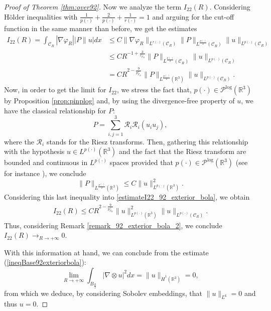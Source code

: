 \documentclass[a4paper,12pt]{amsart}
\theoremstyle{definition}
\theoremstyle{plain}
\def\R{\mathbb{R}}
\renewcommand{\phi}{\varphi}
\let\phi\varphi
\def\R{\mathbb R}
\def\vu{ u }
\def\vn{ \nabla }
\def\mPl{\mathcal{P}^{\text{log}}}
\begin{document}
\begin{proof}[Proof of Theorem \ref{thm:over92}]
Now we analyze the term $I_{22}(R)$. Considering H\"older inequalities with $\frac{1}{p(\cdot)}+\frac{2}{p(\cdot)}+\frac{1}{r(\cdot)}=1$ and arguing for the cut-off function in the same manner than before, we  get the estimates 
\begin{align}
I_{22}(R)=\int_{ \mathcal{C}_R }|\vn \phi_R||P \| \vu| dx
&\leq C \| \vn\phi_R \|_{L^{r(\cdot)}( \mathcal{C}_R )} \|P \|_{L^{\frac{p(\cdot)}{2}}( \mathcal{C}_R )}\|\vu \|_{L^{p(\cdot)}( \mathcal{C}_R )} 
\\
&\leq 
 C R^{-1+\frac 3{r_{ \mathcal{C}_R }^-}}
\|P \|_{L^{\frac{p(\cdot)}{2}}( \mathcal{C}_R )}\|\vu \|_{L^{p(\cdot)}(  \mathcal{C}_R )}
\\
&=
C R^{2-\frac 9{p_{ \mathcal{C}_R }^+}}
\|P \|_{L^{\frac{p(\cdot)}{2}}( \R^3)}
\|\vu \|_{L^{p(\cdot)}(  \mathcal{C}_R )}\label{estimateI22_92_exterior_bola}
.
\end{align}
%
Now, in order to get 
the limit for $I_{22}$, we stress the fact that,  $p(\cdot)\in\mPl(\R^3) $ by Proposition \ref{prop:pinplog}  
 and, by using the divergence-free property of $\vu$, we have the classical relationship for $P$: 
$$\displaystyle{P=\sum_{i,j=1}^3\mathcal{R}_i\mathcal{R}_i(u_iu_j)}
,
$$ 
where the $\mathcal{R}_i$ stands for the   Riesz transforms.
Then,
gathering this relationship with the hypothesis $\vu\in L^{p(\cdot)}(\R^3 )$ and the fact that 
 the Riesz transform are bounded and continuous in $L^{p(\cdot)}$ spaces provided that $p(\cdot)\in\mPl(\R^3) $ (see for instance \cite[Section 12.4]{Diening_Libro}),  we conclude 
 \begin{equation}
 \|P \|_{L^{\frac{p(\cdot)}{2}}( \R^3)}
 \leq C 
 \|\vu \|^2_{L^{p(\cdot)}( \R^3 )}
 .
 \end{equation} 
 Considering this last inequality into \eqref{estimateI22_92_exterior_bola}, we obtain 
 \begin{align}
I_{22}(R)\leq 
C R^{2-\frac 9{p_{ \mathcal{C}_R }^+}}
 \|\vu \|^2_{L^{p(\cdot)}( \R^3 )}
\|\vu \|_{L^{p(\cdot)}(  \mathcal{C}_R )}
.
\end{align}
Thus, considering Remark \ref{remark_92_exterior_bola_2},  we conclude 
$
I_{22}(R) \to_{R\to +\infty} 0. 
$

With this information at hand, we can conclude from the estimate (\ref{ineqBase92exteriorbola}): 
\begin{equation}\label{LimiteSobolev_92_exterior_bola}
\lim_{R\to +\infty}\int_{B_{\frac{R}{2}}}|\vn \otimes \vu|^2 dx=\|\vu\|_{\dot{H}^1(\R^3)}=0,
\end{equation}
from which we deduce, by considering Sobolev embeddings, that $\|\vu\|_{L^6}=0$ and thus  $\vu= 0$. 
\end{proof}
\end{document}
